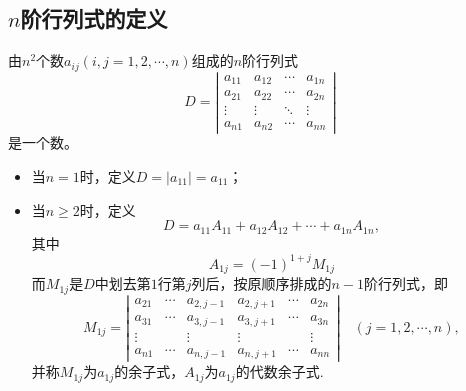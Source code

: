 \documentclass[10pt,a4paper%
tablecaptionabove]{article}
\begin{document}
\begin{CJK}{UTF8}{gkai}
  \subsection{$n$阶行列式的定义}
  \begin{dingyi}[$n$阶行列式]
    由$n^2$个数$a_{ij}(i,j=1,2,\cdots,n)$组成的$n$阶行列式
    \begin{equation}\label{Dn}
      D = \left|
        \begin{array}{cccc}
          a_{11}  &  a_{12} & \cdots & a_{1n} \\
          a_{21}  &  a_{22} & \cdots & a_{2n} \\
          \vdots & \vdots & \ddots & \vdots\\  
          a_{n1}  &  a_{n2} & \cdots & a_{nn} 
        \end{array}
      \right|
    \end{equation}
    是一个数。
    \begin{itemize}
    \item 当$n=1$时，定义$D=|a_{11}|=a_{11}$； 
    \item 当$n\ge2$时，定义
      \begin{equation}
        D = a_{11} A_{11} + a_{12} A_{12} + \cdots + a_{1n} A_{1n},
      \end{equation}
      其中
      $$A_{1j} = (-1)^{1+j} M_{1j}$$
      而$M_{1j}$是$D$中划去第$1$行第$j$列后，按原顺序排成的$n-1$阶行列式，即
      $$
      M_{1j} =   \left|
        \begin{array}{cccccc}
          a_{21}  & \cdots&  a_{2,j-1}  &  a_{2,j+1}  & \cdots & a_{2n} \\
          a_{31}  & \cdots&  a_{3,j-1}  &  a_{3,j+1}  & \cdots & a_{3n} \\
          \vdots &       &  \vdots &  \vdots &  & \vdots\\  
          a_{n1}  & \cdots&  a_{n,j-1}  &  a_{n,j+1}  & \cdots & a_{nn} 
        \end{array}
      \right| \quad (j = 1,2,\cdots, n),
      $$
      并称$M_{1j}$为$a_{1j}$的余子式，$A_{1j}$为$a_{1j}$的代数余子式.
    \end{itemize}
  \end{dingyi}


\end{CJK}
\end{document}

